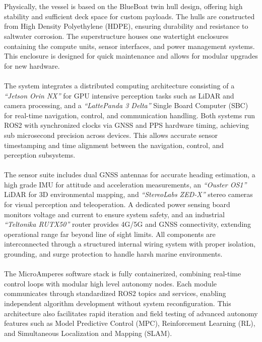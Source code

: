 \\ \\
Physically, the vessel is based on the BlueBoat twin hull design, offering high stability and sufficient deck space for custom payloads. The hulls are constructed from High Density Polyethylene (HDPE), ensuring durability and resistance to saltwater corrosion. The superstructure houses one watertight enclosures containing the compute units, sensor interfaces, and power management systems. This enclosure is designed for quick maintenance and allows for modular upgrades for new hardware.
\\ \\
The system integrates a distributed computing architecture consisting of a \textit{``Jetson Orin NX''} for GPU intensive perception tasks such as LiDAR and camera processing, and a \textit{``LattePanda 3 Delta''} Single Board Computer (SBC) for real-time navigation, control, and communication handling. Both systems run ROS2 with synchronized clocks via GNSS and PPS hardware timing, achieving sub microsecond precision across devices. This allows accurate sensor timestamping and time alignment between the navigation, control, and perception subsystems.
\\ \\
The sensor suite includes dual GNSS antennas for accurate heading estimation, a high grade IMU for attitude and acceleration measurements, an \textit{``Ouster OS1''} LiDAR for 3D environmental mapping, and \textit{``StereoLabs ZED-X''} stereo cameras for visual perception and teleoperation. A dedicated power sensing board monitors voltage and current to ensure system safety, and an industrial \textit{``Teltonika RUTX50''} router provides 4G/5G and GNSS connectivity, extending operational range far beyond line of sight limits. All components are interconnected through a structured internal wiring system with proper isolation, grounding, and surge protection to handle harsh marine environments.
\\ \\
The MicroAmperes software stack is fully containerized, combining real-time control loops with modular high level autonomy nodes. Each module communicates through standardized ROS2 topics and services, enabling independent algorithm development without system reconfiguration. This architecture also facilitates rapid iteration and field testing of advanced autonomy features such as Model Predictive Control (MPC), Reinforcement Learning (RL), and Simultaneous Localization and Mapping (SLAM).
\\ \\
